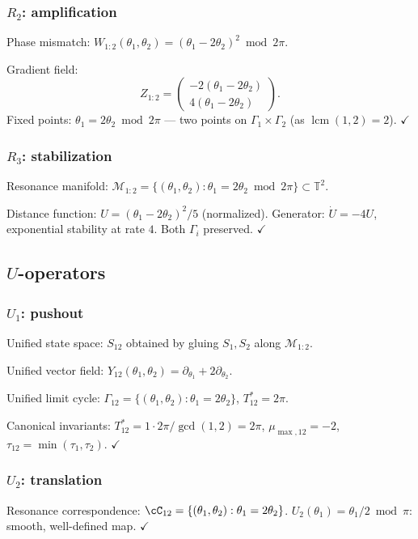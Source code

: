 \documentclass[12pt, oneside]{book}
\theoremstyle{plain}
\theoremstyle{definition}
\theoremstyle{remark}
\newcommand{\T}{\mathbb{T}}
\newcommand{\Orb}{\Gamma}
\newcommand{\cM}{\mathcal{M}}
\DeclareMathOperator{\lcm}{lcm}
\begin{document}
\subsubsection{$R_2$: amplification}

Phase mismatch: $W_{1:2}(\theta_1,\theta_2)=(\theta_1-2\theta_2)^2
\bmod 2\pi$.

Gradient field:
\[
  Z_{1:2} = \begin{pmatrix}-2(\theta_1-2\theta_2)\\
  4(\theta_1-2\theta_2)\end{pmatrix}.
\]
Fixed points: $\theta_1=2\theta_2\bmod 2\pi$ --- two points on
$\Orb_1\times\Orb_2$ (as $\lcm(1,2)=2$). $\checkmark$

\subsubsection{$R_3$: stabilization}

Resonance manifold:
$\cM_{1:2}=\{(\theta_1,\theta_2):\theta_1=2\theta_2\bmod 2\pi\}
\subset\T^2$.

Distance function: $U=(\theta_1-2\theta_2)^2/5$ (normalized).
Generator: $\dot U=-4U$, exponential stability at rate $4$.
Both $\Orb_i$ preserved. $\checkmark$

\subsection{\texorpdfstring{$U$}{U}-operators}

\subsubsection{$U_1$: pushout}

Unified state space: $S_{12}$ obtained by gluing $S_1,S_2$ along
$\cM_{1:2}$.

Unified vector field:
$Y_{12}(\theta_1,\theta_2)=\partial_{\theta_1}+2\partial_{\theta_2}$.

Unified limit cycle:
$\Orb_{12}=\{(\theta_1,\theta_2):\theta_1=2\theta_2\}$, $T_{12}^*=2\pi$.

Canonical invariants:
$T_{12}^*=1\cdot 2\pi/\gcd(1,2)=2\pi$, $\mu_{\max,12}=-2$,
$\tau_{12}=\min(\tau_1,\tau_2)$. $\checkmark$

\subsubsection{$U_2$: translation}

Resonance correspondence: $\cC_{12}=\{(\theta_1,\theta_2):\theta_1=2\theta_2\}$.
$U_2(\theta_1)=\theta_1/2\bmod\pi$: smooth, well-defined map. $\checkmark$
\end{document}
